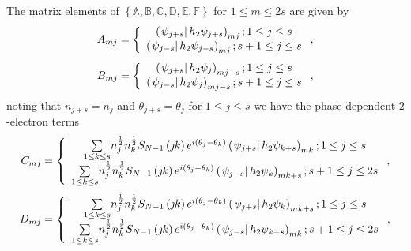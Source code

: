 \documentclass[aps,preprint]{revtex4}%
\begin{document}
The matrix elements of $\left\{  \mathbb{A},\mathbb{B},\mathbb{C}%
,\mathbb{D},\mathbb{E},\mathbb{F}\right\}  $ for $1\leq m\leq2s$ are given by
\begin{equation}
A_{mj}=\left\{
\begin{array}
[c]{c}%
\left(  \left.  \psi_{j+s}\right\vert h_{2}\psi_{j+s}\right)  _{mj};1\leq
j\leq s\\
\left(  \left.  \psi_{j-s}\right\vert h_{2}\psi_{j-s}\right)  _{mj};s+1\leq
j\leq s
\end{array}
\right.  ,
\end{equation}%
\begin{equation}
B_{mj}=\left\{
\begin{array}
[c]{c}%
\left(  \left.  \psi_{j+s}\right\vert h_{2}\psi_{j}\right)  _{mj+s};1\leq
j\leq s\\
\left(  \left.  \psi_{j-s}\right\vert h_{2}\psi_{j}\right)  _{mj-s};s+1\leq
j\leq s
\end{array}
\right.  ,
\end{equation}
noting that $n_{j+s}=n_{j}$ and $\theta_{j+s}=\theta_{j}$ for $1\leq j\leq s$
we have the phase dependent $2$-electron terms
\begin{equation}
C_{mj}=\left\{
\begin{array}
[c]{c}%
{\textstyle\sum\limits_{1\leq k\leq s}}
n_{j}^{\frac{1}{2}}n_{k}^{\frac{1}{2}}S_{N-1}\left(  \jmath k\right)
e^{i\left(  \theta_{j}-\theta_{k}\right)  }\left(  \left.  \psi_{j+s}%
\right\vert h_{2}\psi_{k+s}\right)  _{mk};1\leq j\leq s\\%
{\textstyle\sum\limits_{1\leq k\leq s}}
n_{j}^{\frac{1}{2}}n_{k}^{\frac{1}{2}}S_{N-1}\left(  \jmath k\right)
e^{i\left(  \theta_{j}-\theta_{k}\right)  }\left(  \left.  \psi_{j-s}%
\right\vert h_{2}\psi_{k}\right)  _{mk+s};s+1\leq j\leq2s
\end{array}
\right.  ,
\end{equation}%
\begin{equation}
D_{mj}=\left\{
\begin{array}
[c]{c}%
{\textstyle\sum\limits_{1\leq k\leq s}}
n_{j}^{\frac{1}{2}}n_{k}^{\frac{1}{2}}S_{N-1}\left(  \jmath k\right)
e^{i\left(  \theta_{j}-\theta_{k}\right)  }\left(  \left.  \psi_{j+s}%
\right\vert h_{2}\psi_{k}\right)  _{mk+s};1\leq j\leq s\\%
{\textstyle\sum\limits_{1\leq k\leq s}}
n_{j}^{\frac{1}{2}}n_{k}^{\frac{1}{2}}S_{N-1}\left(  \jmath k\right)
e^{i\left(  \theta_{j}-\theta_{k}\right)  }\left(  \left.  \psi_{j-s}%
\right\vert h_{2}\psi_{k-s}\right)  _{mk};s+1\leq j\leq2s
\end{array}
\right.  ,
\end{equation}
\end{document}

